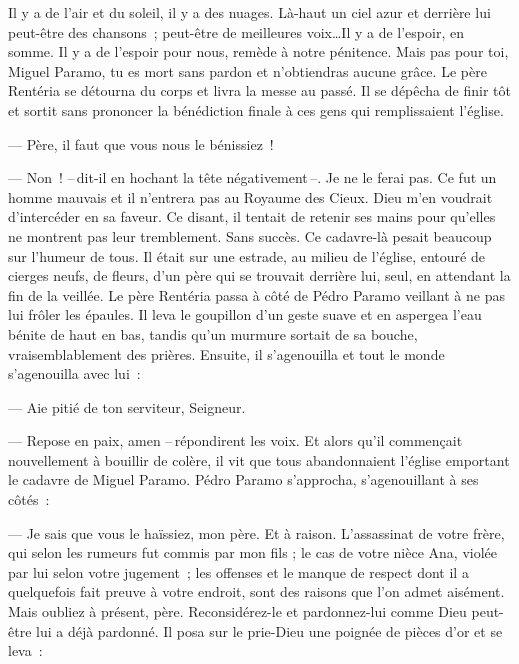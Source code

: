   \og{}Il y a de l'air et du soleil, il y a des nuages. Là-haut un ciel azur et derrière lui peut-être des chansons ; peut-être de meilleures voix\ldots Il y a de l'espoir, en somme. Il y a de l'espoir pour nous, remède à notre pénitence.
\pend
%
\pstart
  \guillemotright Mais pas pour toi, Miguel Paramo, tu es mort sans pardon et n'obtiendras aucune grâce.\fg{}
\pend
%
\pstart
  Le père Rentéria se détourna du corps et livra la messe au passé. Il se dépêcha de finir tôt et sortit sans prononcer la bénédiction finale à ces gens qui remplissaient l'église.

  --- Père, il faut que vous nous le bénissiez !

  --- Non ! --\,dit-il en hochant la tête négativement\,--. Je ne le ferai pas. Ce fut un homme mauvais et il n'entrera pas au Royaume des Cieux. Dieu m'en voudrait d'intercéder en sa faveur.
\pend
%
\pstart
  Ce disant, il tentait de retenir ses mains pour qu'elles ne montrent pas leur tremblement. Sans succès.
\pend
%
\pstart
  Ce cadavre-là pesait beaucoup sur l'humeur de tous. Il était sur une estrade, au milieu de l'église, entouré de cierges neufs, de fleurs, d'un père qui se trouvait derrière lui, seul, en attendant la fin de la veillée.
\pend
%
\pstart
  Le père Rentéria passa à côté de Pédro Paramo veillant à ne pas lui frôler les épaules. Il leva le goupillon d'un geste suave et en aspergea l'eau bénite de haut en bas, tandis qu'un murmure sortait de sa bouche, vraisemblablement des prières. Ensuite, il s'agenouilla et tout le monde s'agenouilla avec lui :

  --- Aie pitié de ton serviteur, Seigneur.

  --- Repose en paix, amen --\,répondirent les voix.
\pend
%
\pstart
  Et alors qu'il commençait nouvellement à bouillir de colère, il vit que tous abandonnaient l'église emportant le cadavre de Miguel Paramo.
\pend
%
\pstart
  Pédro Paramo s'approcha, s'agenouillant à ses côtés :

  --- Je sais que vous le haïssiez, mon père. Et à raison. L'assassinat de votre frère, qui selon les rumeurs fut commis par mon fils ; le cas de votre nièce Ana, violée par lui selon votre jugement ; les offenses et le manque de respect dont il a quelquefois fait preuve à votre endroit, sont des raisons que l'on admet aisément. Mais oubliez à présent, père. Reconsidérez-le et pardonnez-lui comme Dieu peut-être lui a déjà pardonné.
\pend
%
\pstart
  Il posa sur le prie-Dieu une poignée de pièces d'or et se leva :

